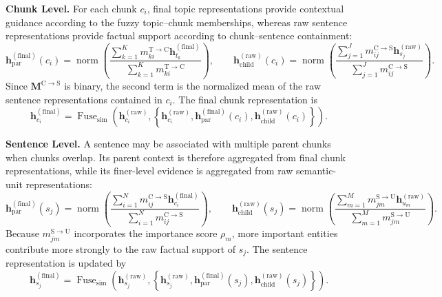 \documentclass{article} %
\begin{document}
\smallskip
\noindent\textbf{Chunk Level.}
For each chunk $c_i$, final topic representations provide contextual guidance according to the fuzzy topic--chunk memberships, whereas raw sentence representations provide factual support according to chunk--sentence containment:
\begin{equation}
\mathbf{h}_{\mathrm{par}}^{(\mathrm{final})}(c_i)
=
\operatorname{norm}\!\left(
\frac{
\sum_{k=1}^{K}
m_{ki}^{\mathrm{T}\to\mathrm{C}}
\mathbf{h}_{t_k}^{(\mathrm{final})}
}{
\sum_{k=1}^{K}m_{ki}^{\mathrm{T}\to\mathrm{C}}
}
\right),
\qquad
\mathbf{h}_{\mathrm{child}}^{(\mathrm{raw})}(c_i)
=
\operatorname{norm}\!\left(
\frac{
\sum_{j=1}^{J}
m_{ij}^{\mathrm{C}\to\mathrm{S}}
\mathbf{h}_{s_j}^{(\mathrm{raw})}
}{
\sum_{j=1}^{J}m_{ij}^{\mathrm{C}\to\mathrm{S}}
}
\right).
\label{eq:chunk_context_evidence}
\end{equation}
Since $\mathbf{M}^{\mathrm{C}\to\mathrm{S}}$ is binary, the second term is the normalized mean of the raw sentence representations contained in $c_i$. The final chunk representation is
\begin{equation}
\mathbf{h}_{c_i}^{(\mathrm{final})}
=
\operatorname{Fuse}_{\mathrm{sim}}\!\left(
\mathbf{h}_{c_i}^{(\mathrm{raw})},
\left\{
\mathbf{h}_{c_i}^{(\mathrm{raw})},
\mathbf{h}_{\mathrm{par}}^{(\mathrm{final})}(c_i),
\mathbf{h}_{\mathrm{child}}^{(\mathrm{raw})}(c_i)
\right\}
\right).
\label{eq:chunk_final_representation}
\end{equation}

\smallskip
\noindent\textbf{Sentence Level.}
A sentence may be associated with multiple parent chunks when chunks overlap. Its parent context is therefore aggregated from final chunk representations, while its finer-level evidence is aggregated from raw semantic-unit representations:
\begin{equation}
\mathbf{h}_{\mathrm{par}}^{(\mathrm{final})}(s_j)
=
\operatorname{norm}\!\left(
\frac{
\sum_{i=1}^{N}
m_{ij}^{\mathrm{C}\to\mathrm{S}}
\mathbf{h}_{c_i}^{(\mathrm{final})}
}{
\sum_{i=1}^{N}m_{ij}^{\mathrm{C}\to\mathrm{S}}
}
\right),
\qquad
\mathbf{h}_{\mathrm{child}}^{(\mathrm{raw})}(s_j)
=
\operatorname{norm}\!\left(
\frac{
\sum_{m=1}^{M}
m_{jm}^{\mathrm{S}\to\mathrm{U}}
\mathbf{h}_{u_m}^{(\mathrm{raw})}
}{
\sum_{m=1}^{M}m_{jm}^{\mathrm{S}\to\mathrm{U}}
}
\right).
\label{eq:sentence_context_evidence}
\end{equation}
Because $m_{jm}^{\mathrm{S}\to\mathrm{U}}$ incorporates the importance score $\rho_m$, more important entities contribute more strongly to the raw factual support of $s_j$. The sentence representation is updated by
\begin{equation}
\mathbf{h}_{s_j}^{(\mathrm{final})}
=
\operatorname{Fuse}_{\mathrm{sim}}\!\left(
\mathbf{h}_{s_j}^{(\mathrm{raw})},
\left\{
\mathbf{h}_{s_j}^{(\mathrm{raw})},
\mathbf{h}_{\mathrm{par}}^{(\mathrm{final})}(s_j),
\mathbf{h}_{\mathrm{child}}^{(\mathrm{raw})}(s_j)
\right\}
\right).
\label{eq:sentence_final_representation}
\end{equation}
\end{document}
